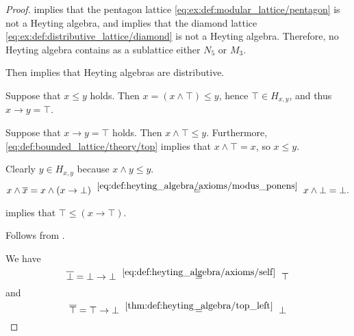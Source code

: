 \begin{proof}
    implies that the pentagon lattice \eqref{eq:ex:def:modular_lattice/pentagon} is not a Heyting algebra, and  implies that the diamond lattice \eqref{eq:ex:def:distributive_lattice/diamond} is not a Heyting algebra. Therefore, no Heyting algebra contains as a sublattice either \( N_5 \) or \( M_3 \).

  Then  implies that Heyting algebras are distributive.


  \SufficiencySubProof* Suppose that \( x \leq y \) holds. Then \( x = (x \wedge \top) \leq y \), hence \( \top \in H_{x,y} \), and thus \( x \rightarrow y = \top \).

  \NecessitySubProof* Suppose that \( x \rightarrow y = \top \) holds. Then \( x \wedge \top \leq y \). Furthermore, \eqref{eq:def:bounded_lattice/theory/top} implies that \( x \wedge \top = x \), so \( x \leq y \).

   Clearly \( y \in H_{x,y} \) because \( x \wedge y \leq y \).

  \begin{equation*}
    x \wedge \oline{x}
    =
    x \wedge (x \rightarrow \bot)
    \reloset {\eqref{eq:def:heyting_algebra/axioms/modus_ponens}} =
    x \wedge \bot
    =
    \bot.
  \end{equation*}

    implies that \( \top \leq (x \rightarrow \top) \).

   Follows from .

   We have
  \begin{equation*}
    \oline{\bot}
    =
    \bot \rightarrow \bot
    \reloset {\eqref{eq:def:heyting_algebra/axioms/self}} =
    \top
  \end{equation*}
  and
  \begin{equation*}
    \oline{\top}
    =
    \top \rightarrow \bot
    \reloset {\ref{thm:def:heyting_algebra/top_left}} =
    \bot
  \end{equation*}


\end{proof}
